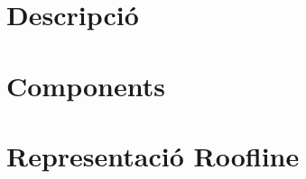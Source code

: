 \documentclass{article}
\begin{document}


\section{Descripció}

\section{Components}

\section{Representació Roofline}
\end{document}
